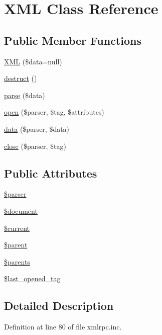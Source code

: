 \hypertarget{classXML}{
\section{XML Class Reference}
\label{classXML}
}
\subsection*{Public Member Functions}
\begin{CompactItemize}
\item 
\hyperlink{classXML_1475a1374023931e2227277f4047c9aa}{XML} (\$data=null)
\item 
\hyperlink{classXML_d1524d80c783b2cd22966462411b9b7d}{destruct} ()
\item 
\hyperlink{classXML_61e6258dc3d5750100e1f0dd08d6334a}{parse} (\$data)
\item 
\hyperlink{classXML_eac7eae74d866d4f5a0cdb9be27ff279}{open} (\$parser, \$tag, \$attributes)
\item 
\hyperlink{classXML_ca70dfbd3e8ce956075181701b09b033}{data} (\$parser, \$data)
\item 
\hyperlink{classXML_60144a2134fc1b7f5b4b1b6a7c56bf04}{close} (\$parser, \$tag)
\end{CompactItemize}
\subsection*{Public Attributes}
\begin{CompactItemize}
\item 
\hyperlink{classXML_fa14fbca44236b30ab5f3dcfc4b02890}{\$parser}
\item 
\hyperlink{classXML_01d565098eeda8bf09e4242a2748d570}{\$document}
\item 
\hyperlink{classXML_7c20d75c1719294f3320a537a32753ca}{\$current}
\item 
\hyperlink{classXML_fa51193c2f0b317f817fa3efa8722227}{\$parent}
\item 
\hyperlink{classXML_c10be009a77c59e80ce5562d4dd35532}{\$parents}
\item 
\hyperlink{classXML_60e7e74df6643f50e0c6ea8252554b3d}{\$last\_\-opened\_\-tag}
\end{CompactItemize}


\subsection{Detailed Description}


Definition at line 80 of file xmlrpc.inc.

